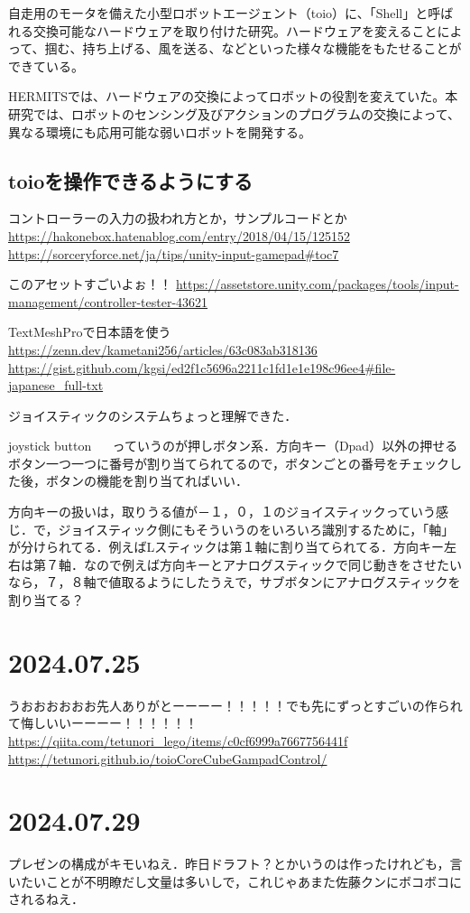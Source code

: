 \documentclass[fleqn,twocolumn]{mynote}
\begin{document}
自走用のモータを備えた小型ロボットエージェント（toio）に、「Shell」と呼ばれる交換可能なハードウェアを取り付けた研究。ハードウェアを変えることによって、掴む、持ち上げる、風を送る、などといった様々な機能をもたせることができている。

HERMITSでは、ハードウェアの交換によってロボットの役割を変えていた。本研究では、ロボットのセンシング及びアクションのプログラムの交換によって、異なる環境にも応用可能な弱いロボットを開発する。

\subsection{toioを操作できるようにする}
コントローラーの入力の扱われ方とか，サンプルコードとか
\url{https://hakonebox.hatenablog.com/entry/2018/04/15/125152}
\url{https://sorceryforce.net/ja/tips/unity-input-gamepad#toc7}

このアセットすごいよぉ！！
\url{https://assetstore.unity.com/packages/tools/input-management/controller-tester-43621}

TextMeshProで日本語を使う
\url{https://zenn.dev/kametani256/articles/63c083ab318136}
\url{https://gist.github.com/kgsi/ed2f1c5696a2211c1fd1e1e198c96ee4#file-japanese_full-txt}

ジョイスティックのシステムちょっと理解できた．

joystick button ~~ っていうのが押しボタン系．方向キー（Dpad）以外の押せるボタン一つ一つに番号が割り当てられてるので，ボタンごとの番号をチェックした後，ボタンの機能を割り当てればいい．

方向キーの扱いは，取りうる値が－１，０，１のジョイスティックっていう感じ．で，ジョイスティック側にもそういうのをいろいろ識別するために，「軸」が分けられてる．例えばLスティックは第１軸に割り当てられてる．方向キー左右は第７軸．なので例えば方向キーとアナログスティックで同じ動きをさせたいなら，７，８軸で値取るようにしたうえで，サブボタンにアナログスティックを割り当てる？

\section*{2024.07.25}
うおおおおおお先人ありがとーーーー！！！！！でも先にずっとすごいの作られて悔しいいーーーー！！！！！！
\url{https://qiita.com/tetunori_lego/items/c0cf6999a7667756441f}
\url{https://tetunori.github.io/toioCoreCubeGampadControl/}

\section*{2024.07.29}
プレゼンの構成がキモいねえ．昨日ドラフト？とかいうのは作ったけれども，言いたいことが不明瞭だし文量は多いしで，これじゃあまた佐藤クンにボコボコにされるねえ．
\end{document}
